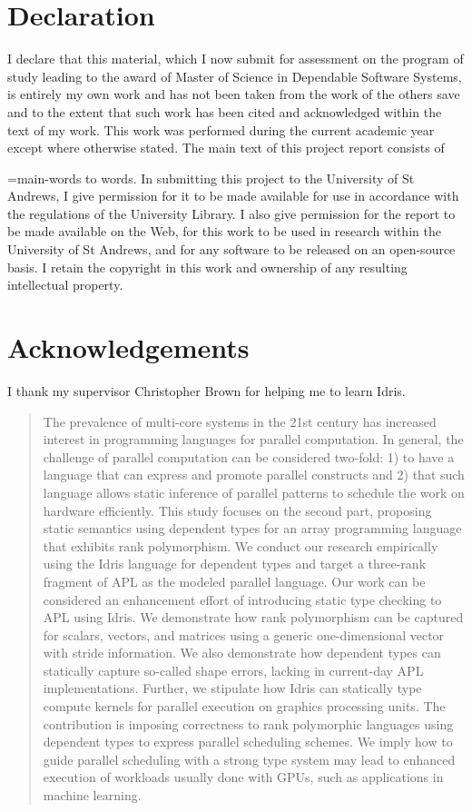 \documentclass{report}
\makeatletter
\newcommand{\quickwordcount}[1]{%
  \immediate\write18{texcount -1 -sum -merge #1.tex > #1-words}%
  \immediate\openin\somefile=#1-words%
  \read\somefile to \@@localdummy%
  \immediate\closein\somefile%
  \setcounter{wordcounter}{\@@localdummy}%
  \@@localdummy%
}
\makeatother
\begin{document}
\section*{Declaration}

I declare that this material, which I now submit for assessment on the program of study leading to the award of Master of Science in Dependable Software Systems, is entirely my own work and has not been taken from the work of the others save and to the extent that such work has been cited and acknowledged within the text of my work. This work was performed during the current academic year except where otherwise stated. The main text of this project report consists of \quickwordcount{main} words. In submitting this project to the University of St Andrews, I give permission for it to be made available for use in accordance with the regulations of the University Library. I also give permission for the report to be made available on the Web, for this work to be used in research within the University of St Andrews, and for any software to be released on an open-source basis. I retain the copyright in this work and ownership of any resulting intellectual property.

\section*{Acknowledgements}

I thank my supervisor Christopher Brown for helping me to learn Idris.

\begin{abstract}

The prevalence of multi-core systems in the 21st century has increased interest in programming languages for parallel computation. In general, the challenge of parallel computation can be considered two-fold: 1) to have a language that can express and promote parallel constructs and 2) that such language allows static inference of parallel patterns to schedule the work on hardware efficiently. This study focuses on the second part, proposing static semantics using dependent types for an array programming language that exhibits rank polymorphism. We conduct our research empirically using the Idris language for dependent types and target a three-rank fragment of APL as the modeled parallel language. Our work can be considered an enhancement effort of introducing static type checking to APL using Idris. We demonstrate how rank polymorphism can be captured for scalars, vectors, and matrices using a generic one-dimensional vector with stride information. We also demonstrate how dependent types can statically capture so-called shape errors, lacking in current-day APL implementations. Further, we stipulate how Idris can statically type compute kernels for parallel execution on graphics processing units. The contribution is imposing correctness to rank polymorphic languages using dependent types to express parallel scheduling schemes. We imply how to guide parallel scheduling with a strong type system may lead to enhanced execution of workloads usually done with GPUs, such as applications in machine learning.
    
\end{abstract}
\end{document}
